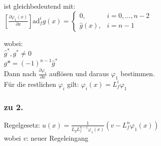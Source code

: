 \documentclass[german]{latex4ei/latex4ei_sheet}
\begin{document}
\begin{sectionbox}
ist gleichbedeutend mit: \\
$\left[ \frac{\partial \varphi_1(x)}{\partial x} \right] \text{ad}_f^i g(x) =
\begin{cases}
  0, & i = 0, \dots, n-2 \\
  \hat{g}(x), & i = n-1
\end{cases}$

wobei:\\
$\hat{g}^*, g^* \neq 0$ \\
$g* = (-1)^{n-1} \hat{g}^*$\\

Dann nach $\frac{\partial \varphi_1}{\partial x}$ auflösen und daraus $\varphi_1$ bestimmen. \\
Für die restlichen $\varphi_i$ gilt: $\varphi_i(x) = L_f^i \varphi_1$

\subsubsection{zu 2.}
Regelgesetz: $u(x) = \frac{1}{L_g L_f^{n-1} \varphi_1(x)} \left( v - L_f^n \varphi_1(x) \right)$\\
wobei $v$: neuer Regeleingang
\end{sectionbox}
\end{document}
